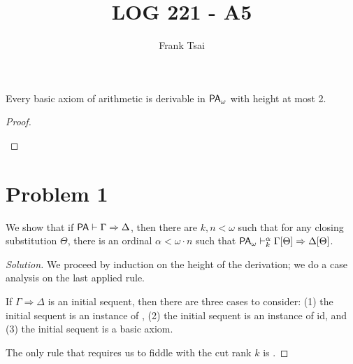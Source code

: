 \documentclass[a4paper]{article}
\title{LOG 221 - A5}
\author{Frank Tsai}
\begin{document}
\maketitle

\begin{lemma}\label{0000}
  Every basic axiom of arithmetic is derivable in $\PAo$ with height at most 2.
\end{lemma}
\begin{proof}
  \begin{mathpar}
  \end{mathpar}
\end{proof}

\section*{Problem 1}\label{0001}

We show that if $\PAd \Gamma \Rightarrow \Delta$, then there are $k, n < \omega$ such that for any closing substitution $\Theta$, there is an ordinal $\alpha < \omega \cdot n$ such that $\PAod{\alpha}{k} \Gamma[\Theta] \Rightarrow \Delta[\Theta]$.

\begin{proof}[Solution]
  We proceed by induction on the height of the derivation; we do a case analysis on the last applied rule.

  If $\Gamma \Rightarrow \Delta$ is an initial sequent, then there are three cases to consider: (1) the initial sequent is an instance of \rLBot, (2) the initial sequent is an instance of id, and (3) the initial sequent is a basic axiom.

  The only rule that requires us to fiddle with the cut rank $k$ is \rCut.
\end{proof}

% 
% 
\end{document}
